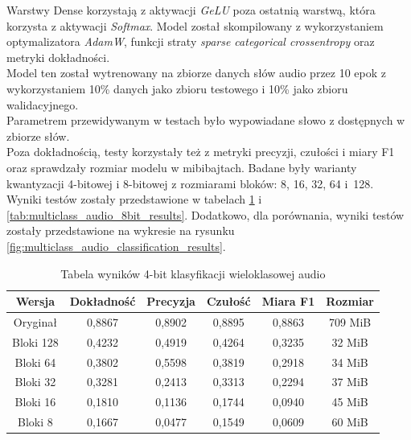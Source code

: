 Warstwy Dense korzystają z aktywacji \textit{GeLU} poza ostatnią warstwą, która korzysta z aktywacji \textit{Softmax}. Model został skompilowany z wykorzystaniem optymalizatora \textit{AdamW}, funkcji straty \textit{sparse categorical crossentropy} oraz metryki dokładności. \\
Model ten został wytrenowany na zbiorze danych słów audio przez 10 epok z wykorzystaniem 10\% danych jako zbioru testowego i 10\% jako zbioru walidacyjnego. \\
Parametrem przewidywanym w testach było wypowiadane słowo z dostępnych w zbiorze słów. \\
Poza dokładnością, testy korzystały też z metryki precyzji, czułości i miary F1 oraz sprawdzały rozmiar modelu w mibibajtach. Badane były warianty kwantyzacji 4-bitowej i 8-bitowej z rozmiarami bloków: 8, 16, 32, 64 i~128. \\
Wyniki testów zostały przedstawione w tabelach \ref{tab:multiclass_audio_4bit_results} i \ref{tab:multiclass_audio_8bit_results}. Dodatkowo, dla porównania, wyniki testów zostały przedstawione na wykresie na rysunku \ref{fig:multiclass_audio_classification_results}.
\begin{table}
    \centering
    \caption{Tabela wyników 4-bit klasyfikacji wieloklasowej audio}
    \label{tab:multiclass_audio_4bit_results}
    \begin{tabular}{|c|c|c|c|c|c|}
        \hline
        \textbf{Wersja} & \textbf{Dokładność} & \textbf{Precyzja} & \textbf{Czułość} & \textbf{Miara F1} & \textbf{Rozmiar} \\
        \hline
        Oryginał & 0,8867 & 0,8902 & 0,8895 & 0,8863 & 709 MiB \\
        \hline
        Bloki 128 & 0,4232 & 0,4919 & 0,4264 & 0,3235 & 32 MiB \\
        \hline
        Bloki 64 & 0,3802 & 0,5598 & 0,3819 & 0,2918 & 34 MiB \\
        \hline
        Bloki 32 & 0,3281 & 0,2413 & 0,3313 & 0,2294 & 37 MiB \\
        \hline
        Bloki 16 & 0,1810 & 0,1136 & 0,1744 & 0,0940 & 45 MiB \\
        \hline
        Bloki 8 & 0,1667 & 0,0477 & 0,1549 & 0,0609 & 60 MiB \\
        \hline
    \end{tabular}
\end{table}
